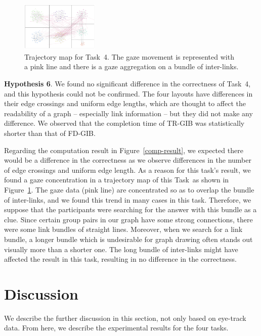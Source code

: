 \documentclass[review]{vgtc}                 %
\begin{document}
\begin{figure}[t]
  \begin{center}
    \includegraphics[width=0.33\textwidth]{pictures/concentration.png}
    \caption{Trajectory map for Task~4. The gaze movement is represented with a pink line and there is a gaze aggregation on a bundle of inter-links.}
    \label{concent}
  \end{center}
\end{figure}

{\bf Hypothesis 6}. We found no significant difference in the correctness of Task~4, and this hypothesis could not be confirmed.
The four layouts have differences in their edge crossings and uniform edge lengths, which are thought to affect the readability of a graph -- especially link information -- but they did not make any difference.
We observed that the completion time of TR-GIB was statistically shorter than that of FD-GIB.

Regarding the computation result in Figure~\ref{comp-result}, we expected there would be a difference in the correctness as we observe differences in the number of edge crossings and uniform edge length.
As a reason for this task's result, we found a gaze concentration in a trajectory map of this Task~as shown in Figure~\ref{concent}.
The gaze data (pink line) are concentrated so as to overlap the bundle of inter-links, and we found this trend in many cases in this task.
Therefore, we suppose that the participants were searching for the answer with this bundle as a clue.
Since certain group pairs in our graph have some strong connections, there were some link bundles of straight lines.
Moreover, when we search for a link bundle, a longer bundle which is undesirable for graph drawing often stands out visually more than a shorter one.
The long bundle of inter-links might have affected the result in this task, resulting in no difference in the correctness. 

\section{Discussion}
We describe the further discussion in this section, not only based on eye-track data. From here, we describe the experimental results for the four tasks.
\end{document}
